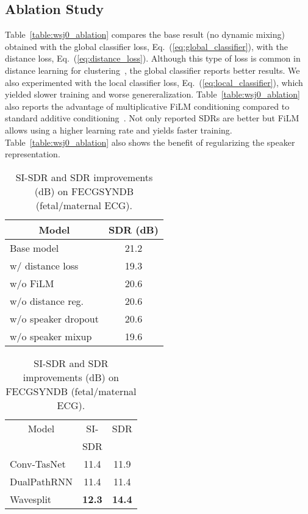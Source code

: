 \documentclass[letterpaper, onecolumn,10 pt]{IEEEtran}
\begin{document}
\subsection{Ablation Study}
\label{sec:ablation}

Table~\ref{table:wsj0_ablation} compares the base result (no dynamic mixing) obtained with the global classifier loss, Eq.~(\ref{eq:global_classifier}), with the distance loss, Eq.~(\ref{eq:distance_loss}). Although this type of loss is common in distance learning for clustering~\cite{wang18:deep_clustering_objectives}, the global classifier reports better results. We also experimented with the local classifier loss, Eq.~(\ref{eq:local_classifier}), which yielded slower training and worse genereralization.
Table~\ref{table:wsj0_ablation} also reports the advantage of multiplicative FiLM conditioning compared to standard additive conditioning~\cite{oord:wavenet}. Not only reported SDRs are better but FiLM allows using a higher learning rate and yields faster training. Table~\ref{table:wsj0_ablation} also shows the benefit of regularizing the speaker representation.

\begin{table}[t]
    \small
    \parbox{0.45\linewidth}{
        \centering
        \caption{Ablation on WSJ0-2mix.}
        \vspace{0.2cm}
        \label{table:wsj0_ablation}
        \begin{tabular}{l|c}
                \hline\hline
                \multicolumn{1}{c|}{Model} & SDR (dB)  \\
                \hline\hline
                Base model           & 21.2 \\\hline
                w/ distance loss     & 19.3 \\
                w/o FiLM             & 20.6 \\
                w/o distance reg.    & 20.6 \\
                w/o speaker dropout  & 20.6 \\
                w/o speaker mixup    & 19.6 \\
                \hline
                \end{tabular}
                }
    \hfill
    \parbox{0.45\linewidth}{
        \centering
        \caption{SI-SDR and SDR improvements (dB) on FECGSYNDB (fetal/maternal ECG).}
        \vspace{0.2cm}
        \label{table:ecg}
        \begin{tabular}{l|c|c}
                \hline\hline
                \multicolumn{1}{c|}{Model} & SI- & SDR \\
                \multicolumn{1}{c|}{} & SDR &  \\
                \hline\hline
                Conv-TasNet & 11.4 & 11.9 \\
                DualPathRNN & 11.4 & 11.4 \\\hline
                Wavesplit   &\textbf{12.3}&\textbf{14.4}\\
                \hline
                \end{tabular}
                }
\end{table}
\end{document}
